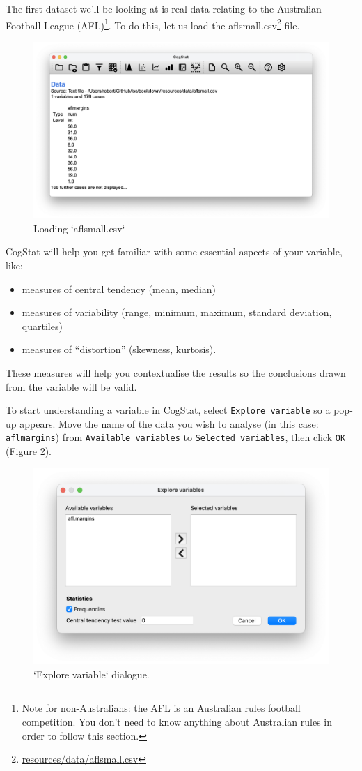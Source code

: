 \documentclass[
  11pt,
  a4paper,
  twoside,symmetric,openright]{book}
\providecommand{\tightlist}{%
  \setlength{\itemsep}{0pt}\setlength{\parskip}{0pt}}
\theoremstyle{break}
\theoremstyle{break}
\DeclareRobustCommand{\href}[2]{#2\footnote{\url{#1}}}
\begin{document}
The first dataset we'll be looking at is real data relating to the Australian Football League (AFL)\footnote{Note for non-Australians: the AFL is an Australian rules football competition. You don't need to know anything about Australian rules in order to follow this section.}. To do this, let us load the \href{resources/data/aflsmall.csv}{aflsmall.csv} file.

\begin{figure}

{\centering \includegraphics[width=0.6\linewidth]{resources/image/loadaflsmall} 

}

\caption{Loading `aflsmall.csv`}\label{fig:loadaflsmall}
\end{figure}

CogStat will help you get familiar with some essential aspects of your variable, like:

\begin{itemize}
\tightlist
\item
  measures of central tendency (mean, median)
\item
  measures of variability (range, minimum, maximum, standard deviation, quartiles)
\item
  measures of ``distortion'' (skewness, kurtosis).
\end{itemize}

These measures will help you contextualise the results so the conclusions drawn from the variable will be valid.

To start understanding a variable in CogStat, select \texttt{Explore\ variable} so a pop-up appears. Move the name of the data you wish to analyse (in this case: \texttt{aflmargins}) from \texttt{Available\ variables} to \texttt{Selected\ variables}, then click \texttt{OK} (Figure \ref{fig:explorevariabledialog}).

\begin{figure}

{\centering \includegraphics[width=0.6\linewidth]{resources/image/explorevariable} 

}

\caption{`Explore variable` dialogue.}\label{fig:explorevariabledialog}
\end{figure}
\end{document}
